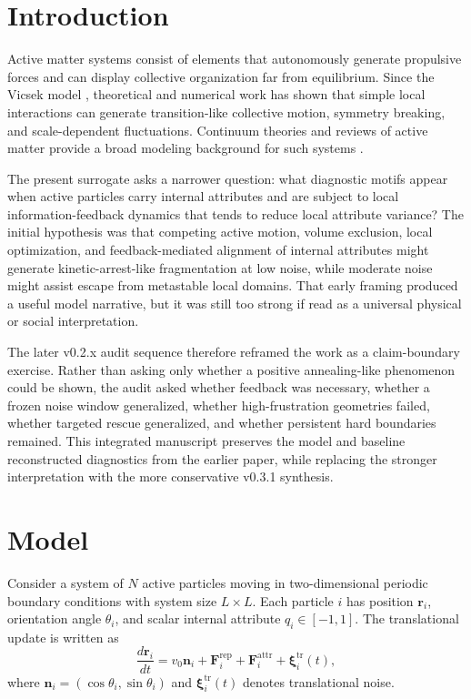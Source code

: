 \documentclass[11pt]{article}
\begin{document}
\section{Introduction}
Active matter systems consist of elements that autonomously generate propulsive forces and can display collective organization far from equilibrium. Since the Vicsek model \cite{vicsek1995}, theoretical and numerical work has shown that simple local interactions can generate transition-like collective motion, symmetry breaking, and scale-dependent fluctuations. Continuum theories and reviews of active matter provide a broad modeling background for such systems \cite{toner1998,marchetti2013,bechinger2016}.

The present surrogate asks a narrower question: what diagnostic motifs appear when active particles carry internal attributes and are subject to local information-feedback dynamics that tends to reduce local attribute variance? The initial hypothesis was that competing active motion, volume exclusion, local optimization, and feedback-mediated alignment of internal attributes might generate kinetic-arrest-like fragmentation at low noise, while moderate noise might assist escape from metastable local domains. That early framing produced a useful model narrative, but it was still too strong if read as a universal physical or social interpretation.

The later v0.2.x audit sequence therefore reframed the work as a claim-boundary exercise. Rather than asking only whether a positive annealing-like phenomenon could be shown, the audit asked whether feedback was necessary, whether a frozen noise window generalized, whether high-frustration geometries failed, whether targeted rescue generalized, and whether persistent hard boundaries remained. This integrated manuscript preserves the model and baseline reconstructed diagnostics from the earlier paper, while replacing the stronger interpretation with the more conservative v0.3.1 synthesis.

\section{Model}
Consider a system of $N$ active particles moving in two-dimensional periodic boundary conditions with system size $L \times L$. Each particle $i$ has position $\mathbf{r}_i$, orientation angle $\theta_i$, and scalar internal attribute $q_i \in [-1,1]$. The translational update is written as
\begin{equation}
\frac{d\mathbf{r}_i}{dt} = v_0 \mathbf{n}_i + \mathbf{F}^{\mathrm{rep}}_i + \mathbf{F}^{\mathrm{attr}}_i + \boldsymbol{\xi}^{\mathrm{tr}}_i(t),
\end{equation}
where $\mathbf{n}_i=(\cos\theta_i,\sin\theta_i)$ and $\boldsymbol{\xi}^{\mathrm{tr}}_i(t)$ denotes translational noise.
\end{document}
